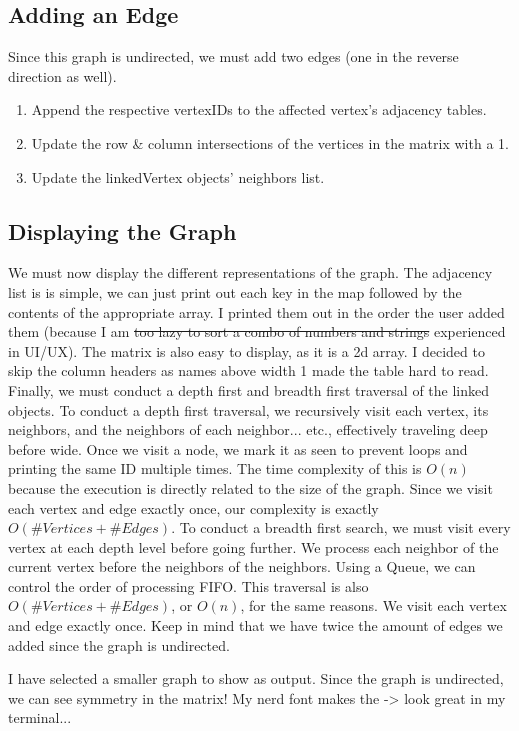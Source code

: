\documentclass[letterpaper, 10pt]{article}
\begin{document}
\subsection{Adding an Edge}
Since this graph is undirected, we must add two edges (one in the reverse direction as well).
\begin{enumerate}
    \item Append the respective vertexIDs to the affected vertex's adjacency tables.
    \item Update the row \& column intersections of the vertices in the matrix with a 1.
    \item Update the linkedVertex objects' neighbors list.
\end{enumerate}


\subsection{Displaying the Graph}
We must now display the different representations of the graph. The adjacency list is is simple, we can just print out each key in the map followed by the contents of the appropriate array. I printed them out in the order the user added them (because I am \sout{too lazy to sort a combo of numbers and strings} experienced in UI/UX). The matrix is also easy to display, as it is a 2d array. I decided to skip the column headers as names above width 1 made the table hard to read. Finally, we must conduct a depth first and breadth first traversal of the linked objects. \newline \indent To conduct a depth first traversal, we recursively visit each vertex, its neighbors, and the neighbors of each neighbor... etc., effectively traveling deep before wide. Once we visit a node, we mark it as seen to prevent loops and printing the same ID multiple times. The time complexity of this is $O(n)$ because the execution is directly related to the size of the graph. Since we visit each vertex and edge exactly once, our complexity is exactly $O(\#Vertices + \#Edges)$. \newline \indent To conduct a breadth first search, we must visit every vertex at each depth level before going further. We process each neighbor of the current vertex before the neighbors of the neighbors. Using a Queue, we can control the order of processing FIFO. This traversal is also $O(\#Vertices + \#Edges)$, or $O(n)$, for the same reasons. We visit each vertex and edge exactly once. Keep in mind that we have twice the amount of edges we added since the graph is undirected.

I have selected a smaller graph to show as output. Since the graph is undirected, we can see symmetry in the matrix! My nerd font makes the -\textgreater{} look great in my terminal...

\end{document}
